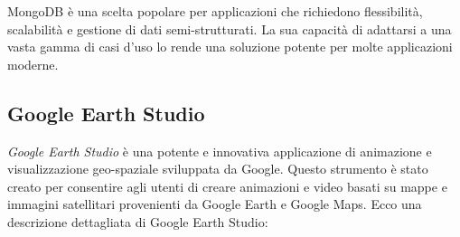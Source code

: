 MongoDB è una scelta popolare per applicazioni che richiedono flessibilità, scalabilità e gestione di dati semi-strutturati. La sua capacità di adattarsi a una vasta gamma di casi d'uso lo rende una soluzione potente per molte applicazioni moderne.

\subsection{Google Earth Studio}

\textit{Google Earth Studio} è una potente e innovativa applicazione di animazione e visualizzazione geo-spaziale sviluppata da Google. Questo strumento è stato creato per consentire agli utenti di creare animazioni e video basati su mappe e immagini satellitari provenienti da Google Earth e Google Maps. Ecco una descrizione dettagliata di Google Earth Studio:


